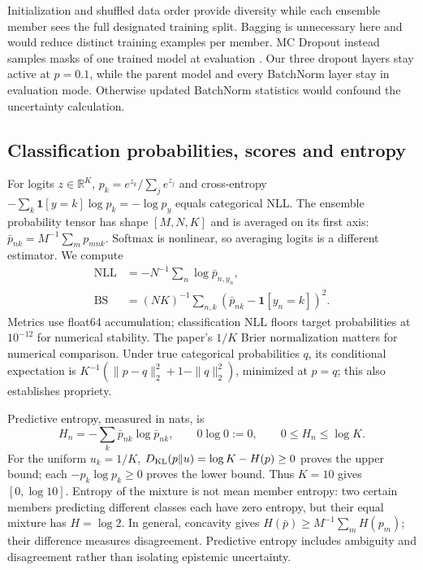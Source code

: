 \documentclass[11pt,a4paper]{article}
\newcommand{\R}{\mathbb{R}}
\begin{document}
Initialization and shuffled data order provide diversity while each ensemble member sees the full designated training split. Bagging is unnecessary here and would reduce distinct training examples per member. MC Dropout instead samples masks of one trained model at evaluation \citep{gal2016dropout}. Our three dropout layers stay active at $p=0.1$, while the parent model and every BatchNorm layer stay in evaluation mode. Otherwise updated BatchNorm statistics would confound the uncertainty calculation.

\subsection{Classification probabilities, scores and entropy}
For logits $z\in\R^K$, $p_k=e^{z_k}/\sum_j e^{z_j}$ and cross-entropy $-\sum_k\mathbf1[y=k]\log p_k=-\log p_y$ equals categorical NLL. The ensemble probability tensor has shape $[M,N,K]$ and is averaged on its first axis: $\bar p_{nk}=M^{-1}\sum_m p_{mnk}$. Softmax is nonlinear, so averaging logits is a different estimator. We compute
\begin{align}
\mathrm{NLL}&=-N^{-1}\sum_n\log\bar p_{n,y_n},\\
\mathrm{BS}&=(NK)^{-1}\sum_{n,k}(\bar p_{nk}-\mathbf1[y_n=k])^2.\label{eq:classmetrics}
\end{align}
Metrics use float64 accumulation; classification NLL floors target probabilities at $10^{-12}$ for numerical stability. The paper's $1/K$ Brier normalization matters for numerical comparison. Under true categorical probabilities $q$, its conditional expectation is
$K^{-1}(\|p-q\|_2^2+1-\|q\|_2^2)$, minimized at $p=q$; this also establishes propriety.

Predictive entropy, measured in nats, is
\begin{equation}
H_n=-\sum_k\bar p_{nk}\log\bar p_{nk},\qquad 0\log0:=0,\qquad
0\leq H_n\leq\log K.\label{eq:entropy}
\end{equation}
For the uniform $u_k=1/K$, $D_{\rm KL}(p\Vert u)=\log K-H(p)\geq0$ proves the upper bound; each $-p_k\log p_k\geq0$ proves the lower bound. Thus $K=10$ gives $[0,\log10]$. Entropy of the mixture is not mean member entropy: two certain members predicting different classes each have zero entropy, but their equal mixture has $H=\log2$. In general, concavity gives $H(\bar p)\geq M^{-1}\sum_m H(p_m)$; their difference measures disagreement. Predictive entropy includes ambiguity and disagreement rather than isolating epistemic uncertainty.
\end{document}
